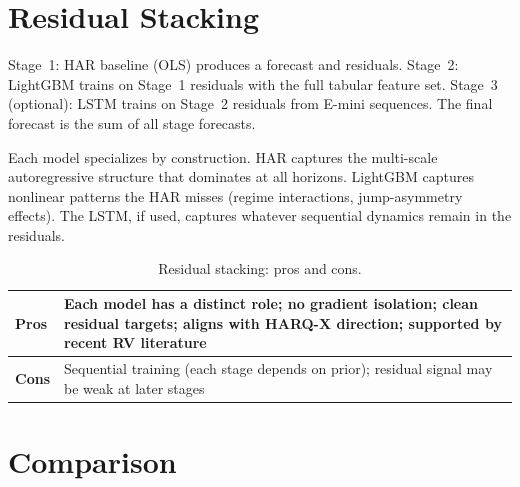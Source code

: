 \section{Residual Stacking}
\label{sec:residual-stacking}

Stage~1: HAR baseline (OLS) produces a forecast and residuals.
Stage~2: LightGBM trains on Stage~1 residuals with the full tabular feature set.
Stage~3 (optional): LSTM trains on Stage~2 residuals from E-mini sequences.
The final forecast is the sum of all stage forecasts.

Each model specializes by construction.
HAR captures the multi-scale autoregressive structure that dominates at all horizons.
LightGBM captures nonlinear patterns the HAR misses (regime interactions, jump-asymmetry effects).
The LSTM, if used, captures whatever sequential dynamics remain in the residuals.

\begin{table}[htbp]
\centering
\caption{Residual stacking: pros and cons.}
\label{tab:residual-stacking}
\small
\begin{tabular}{@{}lp{10cm}@{}}
\toprule
\textbf{Pros} & Each model has a distinct role; no gradient isolation; clean residual targets; aligns with HARQ-X direction; supported by recent RV literature \\
\midrule
\textbf{Cons} & Sequential training (each stage depends on prior); residual signal may be weak at later stages \\
\bottomrule
\end{tabular}
\end{table}


\section{Comparison}
\label{sec:architecture-comparison}

